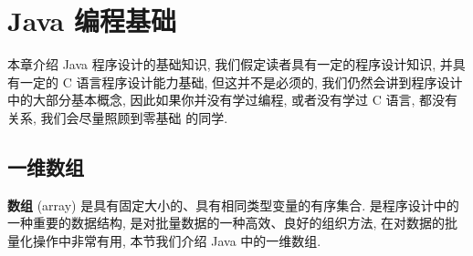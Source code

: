 \documentclass[10pt,UTF8]{book} %
\begin{document}



% 







\newpage
\thispagestyle{empty}

\pagestyle{plain}
{\small \tableofcontents}
\newpage
\thispagestyle{empty}
\cleardoublepage %


\makeatletter
\let\ps@plain\ps@empty
\makeatother

\mainmatter

\chapter{Java 编程基础}

本章介绍 Java 程序设计的基础知识, 我们假定读者具有一定的程序设计知识, 并具有一定的
C 语言程序设计能力基础, 但这并不是必须的, 我们仍然会讲到程序设计中的大部分基本概念,
因此如果你并没有学过编程, 或者没有学过 C 语言, 都没有关系, 我们会尽量照顾到零基础
的同学.

\section{一维数组}

\textbf{数组} (array) 是具有固定大小的、具有相同类型变量的有序集合.
是程序设计中的一种重要的数据结构, 是对批量数据的一种高效、良好的组织方法,
在对数据的批量化操作中非常有用, 本节我们介绍 Java 中的一维数组.
\end{document}
